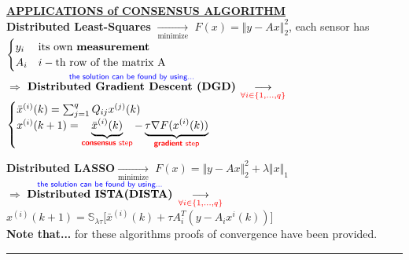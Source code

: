 \documentclass[a4paper, 12pt]{article}
\begin{document}
\noindent
{\underline{\normalsize\textbf{APPLICATIONS of CONSENSUS ALGORITHM}}}\\
\textbf{\textsf{Distributed Least-Squares}} $\underset{\text{minimize}}{\longrightarrow}$ $F(x)=\Vert y-Ax \Vert_2^2$, each sensor has $\begin{cases}
    y_i & \text{its own \textbf{measurement}}\\
    A_i & i-\text{th row of the matrix A}
\end{cases}$ \\
$\Longrightarrow$ 
$\overset{\textsf{\color{blue}the solution can be found by using...}}{\textbf{Distributed Gradient Descent (DGD)}}$
    $\underset{\color{red}\forall i\in\{1,...,q\}}{\longrightarrow}$
  $ \begin{cases}
    \bar{x}^{(i)}(k)=\sum_{j=1}^{q} Q_{ij}x^{(j)}(k) \\
    x^{(i)}(k+1)=\underbrace{\bar{x}^{(i)}(k)}_\textsf{\color{red} \textbf{consensus} step}-\underbrace{\tau\nabla F(x^{(i)}(k))}_\textsf{\color{red}\textbf{gradient} step}
\end{cases}$

\noindent
\textbf{\textsf{Distributed LASSO}}$\underset{\text{minimize}}{\longrightarrow}$ $F(x)=\Vert y-Ax \Vert_2^2 + \lambda \Vert x \Vert_1$\\
$\Longrightarrow$ 
$\overset{\textsf{\color{blue}the solution can be found by using...}}{\textbf{Distributed ISTA(DISTA)}}$
$\underset{\color{red}\forall i\in\{1,...,q\}}{\longrightarrow}$
{\large{
    $x^{(i)}(k+1)=\mathbb{S}_{\lambda\tau}\big[ 
        \bar{x}^{(i)}(k) +
        \tau A_i^T(y-A_ix^{i}(k))    
    \big]$
}}\\

\noindent
{\small{
    \textbf{Note that...} for these algorithms proofs of convergence have been provided.
}}


\begin{center}
    \rule{300pt}{.2pt}
    \vspace{-1ex}
\end{center}


\end{document}

